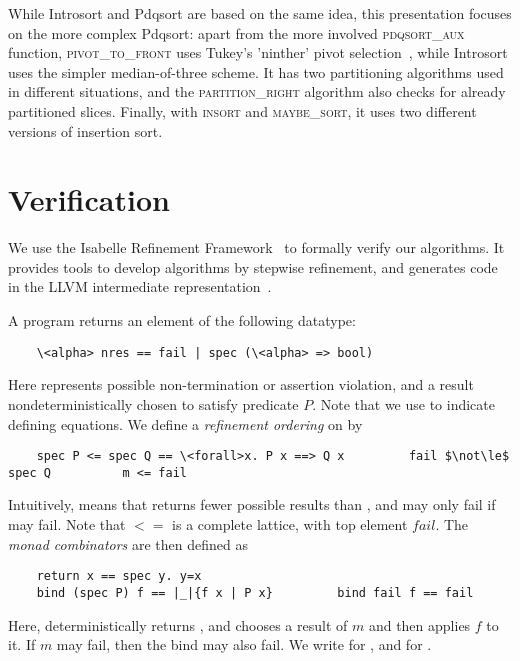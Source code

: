 \documentclass[runningheads]{llncs}
\begin{document}
  While Introsort and Pdqsort are based on the same idea, this presentation focuses on the more complex Pdqsort:
  apart from the more involved \textsc{pdqsort\_aux} function,
  \textsc{pivot\_to\_front} uses Tukey's 'ninther' pivot selection~\cite{Bent93}, while Introsort uses the simpler median-of-three scheme.
  It has two partitioning algorithms used in different situations, and the \textsc{partition\_right} algorithm also
  checks for already partitioned slices. Finally, with \textsc{insort} and \textsc{maybe\_sort}, it uses two different
  versions of insertion sort.


  \section{Verification}
  We use the Isabelle Refinement Framework~\cite{LaTu12,La19-llvm} to formally verify our algorithms.
  It provides tools to develop algorithms by stepwise refinement, and generates code in the LLVM intermediate representation~\cite{LLVM-manual}.

  A program returns an element of the following datatype:
  \begin{lstlisting}
    \<alpha> nres == fail | spec (\<alpha> => bool)
  \end{lstlisting}
  Here  represents possible non-termination or assertion violation, and 
  a result nondeterministically chosen to satisfy predicate $P$. Note that we use \is{==} to indicate defining equations.
  We define a \emph{refinement ordering} on  by
  \begin{lstlisting}
    spec P <= spec Q == \<forall>x. P x ==> Q x         fail $\not\le$ spec Q          m <= fail
  \end{lstlisting}
  Intuitively,  means
  that  returns fewer possible results than , and may only fail if  may fail.
  Note that \is$<=$ is a complete lattice, with top element \is$fail$.
  The \emph{monad combinators} are then defined as
  \begin{lstlisting}
    return x == spec y. y=x
    bind (spec P) f == |_|{f x | P x}         bind fail f == fail
  \end{lstlisting}
  Here,  deterministically returns , and  chooses a result of \is$m$ and then applies
  \is$f$ to it. If \is$m$ may fail, then the bind may also fail.
  We write  for , and  for .
\end{document}
